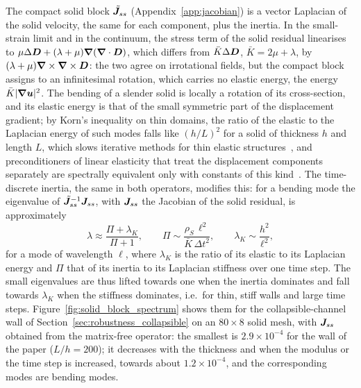 The compact solid block $\tilde{\boldsymbol{J}}_{ss}$ (Appendix~\ref{app:jacobian}) is a vector Laplacian of the solid velocity, the same for each component, plus the inertia.
In the small-strain limit and in the continuum, the stress term of the solid residual linearises to $\mu\Delta\boldsymbol{D}+(\lambda+\mu)\boldsymbol{\nabla}(\boldsymbol{\nabla}\cdot\boldsymbol{D})$, which differs from $\bar{K}\Delta\boldsymbol{D}$, $\bar{K}=2\mu+\lambda$, by $(\lambda+\mu)\boldsymbol{\nabla}\times\boldsymbol{\nabla}\times\boldsymbol{D}$: the two agree on irrotational fields, but the compact block assigns to an infinitesimal rotation, which carries no elastic energy, the energy $\bar{K}|\boldsymbol{\nabla}\boldsymbol{u}|^2$.
The bending of a slender solid is locally a rotation of its cross-section, and its elastic energy is that of the small symmetric part of the displacement gradient; by Korn's inequality on thin domains, the ratio of the elastic to the Laplacian energy of such modes falls like $(h/L)^2$ for a solid of thickness $h$ and length $L$, which slows iterative methods for thin elastic structures~\citep{Ovtchinnikov1996, Ovtchinnikov1998}, and preconditioners of linear elasticity that treat the displacement components separately are spectrally equivalent only with constants of this kind~\citep{AxelssonGustafsson1978, Blaheta1994}.
The time-discrete inertia, the same in both operators, modifies this: for a bending mode the eigenvalue of $\tilde{\boldsymbol{J}}_{ss}^{-1}\boldsymbol{J}_{ss}$, with $\boldsymbol{J}_{ss}$ the Jacobian of the solid residual, is approximately
\begin{equation}
\lambda \approx \frac{\Pi + \lambda_K}{\Pi + 1},
\qquad
\Pi \sim \frac{\rho_S\,\ell^2}{\bar{K}\,\Delta t^2},
\qquad
\lambda_K \sim \frac{h^2}{\ell^2},
\label{eqn:solid_block_eigenvalue}
\end{equation}
for a mode of wavelength $\ell$, where $\lambda_K$ is the ratio of its elastic to its Laplacian energy and $\Pi$ that of its inertia to its Laplacian stiffness over one time step.
The small eigenvalues are thus lifted towards one when the inertia dominates and fall towards $\lambda_K$ when the stiffness dominates, i.e.\ for thin, stiff walls and large time steps.
Figure~\ref{fig:solid_block_spectrum} shows them for the collapsible-channel wall of Section~\ref{sec:robustness_collapsible} on an $80\times8$ solid mesh, with $\boldsymbol{J}_{ss}$ obtained from the matrix-free operator: the smallest is $2.9\times10^{-4}$ for the wall of the paper ($L/h = 200$); it decreases with the thickness and when the modulus or the time step is increased, towards about $1.2\times10^{-4}$, and the corresponding modes are bending modes.
